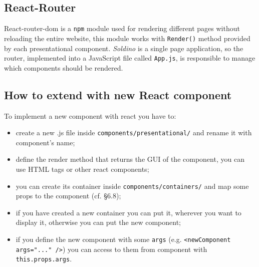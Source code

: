\subsection{React-Router} 
React-router-dom is a \texttt{npm} module used for rendering different pages without reloading the entire website, this module works with \texttt{Render()} method provided by each presentational component. \textit{Soldino} is a single page application, so the router, implemented into a JavaScript file called \texttt{App.js}, is responsible to manage which components should be rendered.
\subsection{How to extend with new React component}
To implement a new component with react you have to:
\begin{itemize}
	\item create a new .js file inside \texttt{components/presentational/} and rename it with component's name;
	\item define the render method that returns the GUI of the component, you can use HTML tags or other react components;
	\item you can create its container inside \texttt{components/containers/} and map some props to the component (cf. §6.8);
	\item if you have created a new container you can put it, wherever you want to display it, otherwise you can put the new component;
	\item if you define the new component with some \texttt{args} (e.g. \texttt{<newComponent args="..." />}) you can access to them from component with \texttt{this.props.args}.
\end{itemize}


